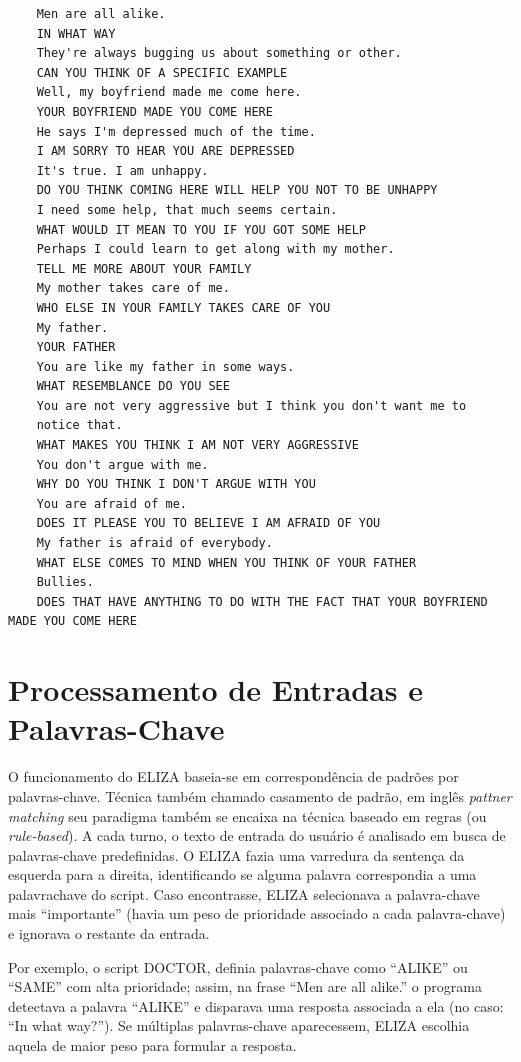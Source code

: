 \documentclass[14pt,a4paper,oneside]{book}
\begin{document}
\begin{verbatim}
	Men are all alike. 
	IN WHAT WAY 
	They're always bugging us about something or other. 
	CAN YOU THINK OF A SPECIFIC EXAMPLE 
	Well, my boyfriend made me come here. 
	YOUR BOYFRIEND MADE YOU COME HERE 
	He says I'm depressed much of the time. 
	I AM SORRY TO HEAR YOU ARE DEPRESSED 
	It's true. I am unhappy. 
	DO YOU THINK COMING HERE WILL HELP YOU NOT TO BE UNHAPPY 
	I need some help, that much seems certain. 
	WHAT WOULD IT MEAN TO YOU IF YOU GOT SOME HELP 
	Perhaps I could learn to get along with my mother. 
	TELL ME MORE ABOUT YOUR FAMILY 
	My mother takes care of me. 
	WHO ELSE IN YOUR FAMILY TAKES CARE OF YOU 
	My father. 
	YOUR FATHER 
	You are like my father in some ways. 
	WHAT RESEMBLANCE DO YOU SEE 
	You are not very aggressive but I think you don't want me to 
	notice that. 
	WHAT MAKES YOU THINK I AM NOT VERY AGGRESSIVE 
	You don't argue with me. 
	WHY DO YOU THINK I DON'T ARGUE WITH YOU 
	You are afraid of me. 
	DOES IT PLEASE YOU TO BELIEVE I AM AFRAID OF YOU 
	My father is afraid of everybody. 
	WHAT ELSE COMES TO MIND WHEN YOU THINK OF YOUR FATHER 
	Bullies. 
	DOES THAT HAVE ANYTHING TO DO WITH THE FACT THAT YOUR BOYFRIEND MADE YOU COME HERE 
\end{verbatim}
	




\section{Processamento de Entradas e Palavras-Chave}

O funcionamento do ELIZA baseia-se em correspondência de padrões por palavras-chave. Técnica também chamado casamento de padrão, em inglês \textit{pattner matching} seu paradigma também se encaixa na técnica baseado em regras (ou \textit{rule-based}). 
A cada turno, o texto de entrada do usuário é analisado em busca de palavras-chave predefinidas. 
O ELIZA fazia uma varredura da sentença da esquerda para a direita, identificando se alguma palavra correspondia a uma palavra\-chave do script. 
Caso encontrasse, ELIZA selecionava a palavra-chave mais “importante” (havia um peso de prioridade associado a cada palavra-chave) e ignorava o restante da entrada.

Por exemplo, o script DOCTOR, definia palavras-chave como “ALIKE” ou “SAME” com alta prioridade; assim, na frase “Men are all alike.” o programa detectava a palavra “ALIKE” e disparava uma resposta associada a ela (no caso: “In what way?”). Se múltiplas palavras-chave aparecessem, ELIZA escolhia aquela de maior peso para formular a resposta.
\end{document}
